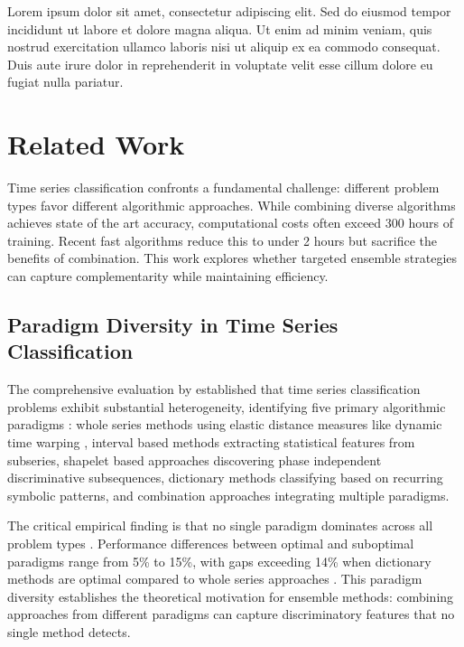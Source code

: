 \documentclass[pdflatex,sn-basic]{sn-jnl}           %
\theoremstyle{thmstyleone}%
\theoremstyle{thmstyletwo}%
\theoremstyle{thmstylethree}%
\begin{document}
Lorem ipsum dolor sit amet, consectetur adipiscing elit. Sed do eiusmod tempor incididunt ut labore et dolore magna aliqua. Ut enim ad minim veniam, quis nostrud exercitation ullamco laboris nisi ut aliquip ex ea commodo consequat. Duis aute irure dolor in reprehenderit in voluptate velit esse cillum dolore eu fugiat nulla pariatur.

\clearpage

\section{Related Work}\label{sec2}

Time series classification confronts a fundamental challenge: different problem types favor different algorithmic approaches. While combining diverse algorithms achieves state of the art accuracy, computational costs often exceed 300 hours of training. Recent fast algorithms reduce this to under 2 hours but sacrifice the benefits of combination. This work explores whether targeted ensemble strategies can capture complementarity while maintaining efficiency.

\subsection{Paradigm Diversity in Time Series Classification}

The comprehensive evaluation by \citet{tsc-bakeoff} established that time series classification problems exhibit substantial heterogeneity, identifying five primary algorithmic paradigms \citep[Section~2, pp.~610--611]{tsc-bakeoff}: whole series methods using elastic distance measures like dynamic time warping \citep[p.~611]{tsc-bakeoff}, interval based methods extracting statistical features from subseries, shapelet based approaches discovering phase independent discriminative subsequences, dictionary methods classifying based on recurring symbolic patterns, and combination approaches integrating multiple paradigms.

The critical empirical finding is that no single paradigm dominates across all problem types \citep[Table~11, p.~648]{tsc-bakeoff}. Performance differences between optimal and suboptimal paradigms range from 5\% to 15\%, with gaps exceeding 14\% when dictionary methods are optimal compared to whole series approaches \citep[Table~11, p.~648]{tsc-bakeoff}. This paradigm diversity establishes the theoretical motivation for ensemble methods: combining approaches from different paradigms can capture discriminatory features that no single method detects.
\end{document}
